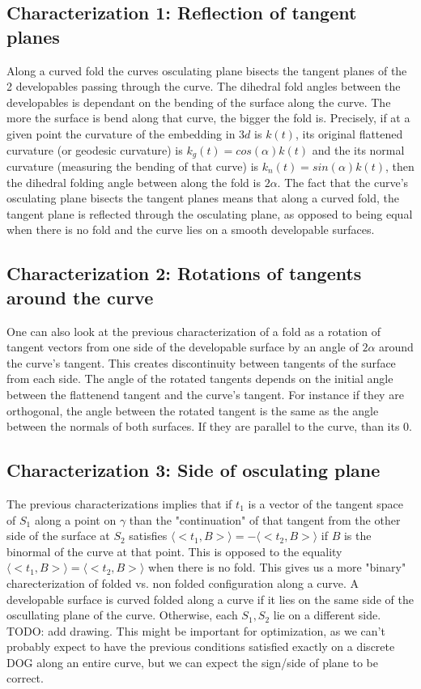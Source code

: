 \documentclass{article}
\theoremstyle{definition}
\begin{document}
\subsection{Characterization 1: Reflection of tangent planes}
Along a curved fold the curves osculating plane bisects the tangent planes of the 2 developables passing through the curve. The dihedral fold angles between the developables is dependant on the bending of the surface along the curve. The more the surface is bend along that curve, the bigger the fold is. Precisely, if at a given point the curvature of the embedding in $3d$ is $k(t)$, its original flattened curvature (or geodesic curvature) is $k_g(t) = cos(\alpha)k(t)$ and the its normal curvature (measuring the bending of that curve) is $k_n(t) = sin(\alpha)k(t)$, then the dihedral folding angle between along the fold is $2\alpha$. The fact that the curve's osculating plane bisects the tangent planes means that along a curved fold, the tangent plane is reflected through the osculating plane, as opposed to being equal when there is no fold and the curve lies on a smooth developable surfaces.

\subsection{Characterization 2: Rotations of tangents around the curve}
One can also look at the previous characterization of a fold as a rotation of tangent vectors from one side of the developable surface by an angle of $2\alpha$ around the curve's tangent. This creates discontinuity between tangents of the surface from each side. The angle of the rotated tangents depends on the initial angle between the flattenend tangent and the curve's tangent. For instance if they are orthogonal, the angle between the rotated tangent is the same as the angle between the normals of both surfaces. If they are parallel to the curve, than its 0.

\subsection{Characterization 3: Side of osculating plane}
The previous characterizations implies that if $t_1$ is a vector of the tangent space of $S_1$ along a point on $\gamma$ than the "continuation" of that tangent from the other side of the surface at $S_2$ satisfies $\langle <t_1,B> \rangle = -\langle <t_2,B> \rangle$ if $B$ is the binormal of the curve at that point. This is opposed to the equality $\langle <t_1,B> \rangle = \langle <t_2,B> \rangle$ when there is no fold. This gives us a more "binary" charecterization of folded vs. non folded configuration along a curve. A developable surface is curved folded along a curve if it lies on the same side of the oscullating plane of the curve. Otherwise, each $S_1,S_2$ lie on a different side. TODO: add drawing.
This might be important for optimization, as we can't probably expect to have the previous conditions satisfied exactly on a discrete DOG along an entire curve, but we can expect the sign/side of plane to be correct.
\end{document}
